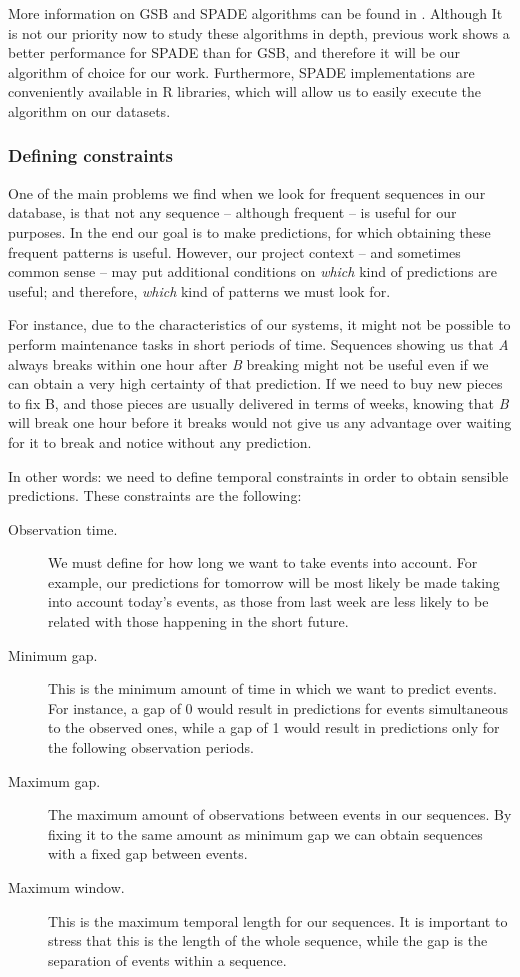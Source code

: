 \documentclass[a4paper,12pt]{article}
\begin{document}
More information on GSB and SPADE algorithms can be found in \cite{zaki2001spade, zhao2003sequential, srikant1996mining}. Although It is not our priority now to study these algorithms in depth, previous work shows a better performance for SPADE than for GSB, and therefore it will be our algorithm of choice for our work. Furthermore, SPADE implementations are conveniently available in R\cite{ihaka1996r} libraries, which will allow us to easily execute the algorithm on our datasets.

\subsubsection{Defining constraints}
One of the main problems we find when we look for frequent sequences in our database, is that not any sequence -- although frequent -- is useful for our purposes. In the end our goal is to make predictions, for which obtaining these frequent patterns is useful. However, our project context -- and sometimes common sense -- may put additional conditions on \emph{which} kind of predictions are useful; and therefore, \emph{which} kind of patterns we must look for.

For instance, due to the characteristics of our systems, it might not be possible to perform maintenance tasks in short periods of time. Sequences showing us that \emph{A} always breaks within one hour after \emph{B} breaking might not be useful even if we can obtain a very high certainty of that prediction. If we need to buy new pieces to fix B, and those pieces are usually delivered in terms of weeks, knowing that \emph{B} will break one hour before it breaks would not give us any advantage over waiting for it to break and notice without any prediction.

In other words: we need to define temporal constraints in order to obtain sensible predictions\cite{zaki2000cspade}. These constraints are the following:

\begin{description}
\item[Observation time.] We must define for how long we want to take events into account. For example, our predictions for tomorrow will be most likely be made taking into account today's events, as those from last week are less likely to be related with those happening in the short future.
\item[Minimum gap.] This is the minimum amount of time in which we want to predict events. For instance, a gap of 0 would result in predictions for events simultaneous to the observed ones, while a gap of 1 would result in predictions only for the following observation periods.
\item[Maximum gap.] The maximum amount of observations between events in our sequences. By fixing it to the same amount as minimum gap we can obtain sequences with a fixed gap between events.
\item[Maximum window.] This is the maximum temporal length for our sequences. It is important to stress that this is the length of the whole sequence, while the gap is the separation of events within a sequence.
\end{description}
\end{document}
